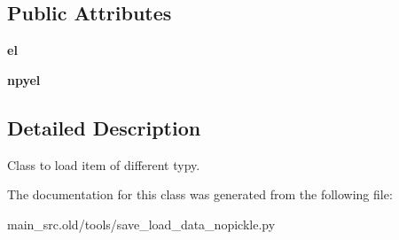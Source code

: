 \subsection*{Public Attributes}
\begin{DoxyCompactItemize}
\item 
\hypertarget{classmain__src_8old_1_1tools_1_1save__load__data__nopickle_1_1LoadItems_aa1babf2c9fdcd506b256dd9b8d66aa57}{{\bfseries el}}\label{classmain__src_8old_1_1tools_1_1save__load__data__nopickle_1_1LoadItems_aa1babf2c9fdcd506b256dd9b8d66aa57}

\item 
\hypertarget{classmain__src_8old_1_1tools_1_1save__load__data__nopickle_1_1LoadItems_aaad336b7b0c60c399649d69686af88ef}{{\bfseries npyel}}\label{classmain__src_8old_1_1tools_1_1save__load__data__nopickle_1_1LoadItems_aaad336b7b0c60c399649d69686af88ef}

\end{DoxyCompactItemize}


\subsection{Detailed Description}
Class to load item of different typy. 

The documentation for this class was generated from the following file\-:\begin{DoxyCompactItemize}
\item 
main\-\_\-src.\-old/tools/save\-\_\-load\-\_\-data\-\_\-nopickle.\-py\end{DoxyCompactItemize}
